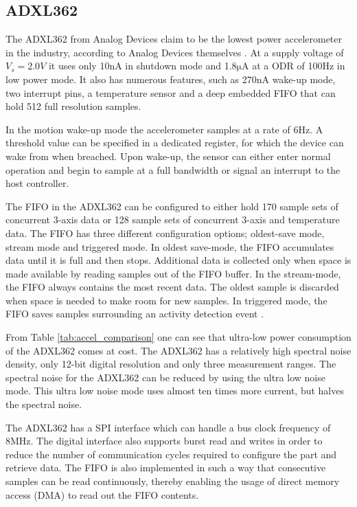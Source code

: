 \subsection{ADXL362}

The ADXL362 from Analog Devices claim to be the lowest power accelerometer in the industry, according to Analog Devices themselves \cite{analog12}. At a supply voltage of $V_s = 2.0 V$ it uses only 10nA in shutdown mode and 1.8$\si{\micro\ampere}$ at a ODR of 100Hz in low power mode. It also has numerous features, such as 270nA wake-up mode, two interrupt pins, a temperature sensor and a deep embedded FIFO that can hold 512 full resolution samples. 

In the motion wake-up mode the accelerometer samples at a rate of 6Hz. A threshold value can be specified in a dedicated register, for which the device can wake from when breached. Upon wake-up, the sensor can either enter normal operation and begin to sample at a full bandwidth or signal an interrupt to the host controller.

The FIFO in the ADXL362 can be configured to either hold 170 sample sets of concurrent 3-axis data or 128 sample sets of concurrent 3-axis and temperature data. The FIFO has three different configuration options; oldest-save mode, stream mode and triggered mode. In oldest save-mode, the  FIFO accumulates data until it is full and then stops. Additional data is collected only when space is made available by reading samples out of the FIFO buffer. In the stream-mode, the FIFO always contains the most recent data. The oldest sample is discarded when space is needed to make room for new samples. In triggered mode, the FIFO saves samples surrounding an activity detection event \cite[p~38]{ADXL362}.

From Table \ref{tab:accel_comparison} one can see that ultra-low power consumption of the ADXL362 comes at cost. The ADXL362 has a relatively high spectral noise density, only 12-bit digital resolution and only three measurement ranges. The spectral noise for the ADXL362 can be reduced by using the ultra low noise mode. This ultra low noise mode uses almost ten times more current, but halves the spectral noise.

The ADXL362 has a SPI interface which can handle a bus clock frequency of 8MHz. The digital interface also supports burst read and writes in order to reduce the number of communication cycles required to configure the part and retrieve data. The FIFO is also implemented in such a way that consecutive samples can be read continuously, thereby enabling the usage of direct memory access (DMA) to read out the FIFO contents.

